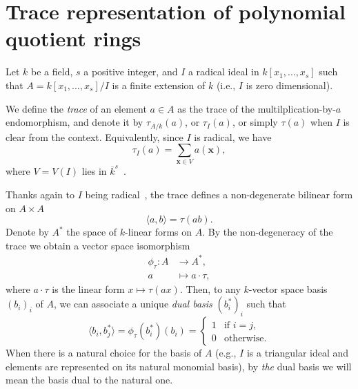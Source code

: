 \documentclass[12pt]{article}
\def\x {\ensuremath{\mathbf{x}}}
\newcommand{\ang}[1]{\langle#1\rangle}
\begin{document}

\section{Trace representation of polynomial quotient rings}

Let $k$ be a field, $s$ a positive integer, and $I$ a radical ideal in
$k[x_1,\dots,x_s]$ such that $A=k[x_1,\dots,x_s]/I$ is a finite
extension of $k$ (i.e., $I$ is zero dimensional).

We define the \emph{trace} of an element $a\in A$ as the trace of the
multilplication-by-$a$ endomorphism, and denote it by $\tau_{A/k}(a)$,
or $\tau_I(a)$, or simply $\tau(a)$ when $I$ is clear from the
context.  Equivalently, since $I$ is radical, we have
\begin{equation}\label{eq:tr}
\tau_{I}(a)=\sum_{\x \in V} a(\x),
\end{equation}
where $V=V(I)$ lies in $\overline{k}^s$~\cite{todo}.

Thanks again to $I$ being radical~\cite{todo}, the trace defines a
non-degenerate bilinear form on $A\times A$
\begin{equation}
  \label{eq:trace-def}
  \ang{a,b} = \tau(ab).
\end{equation}
Denote by $A^\ast$ the space of $k$-linear forms on $A$. By the
non-degeneracy of the trace we obtain a vector space isomorphism
\begin{equation}
  \label{eq:trace-isom}
  \begin{aligned}
  \phi_\tau : A &\to A^\ast,\\
            a &\mapsto a\cdot\tau,
  \end{aligned}
\end{equation}
where $a\cdot\tau$ is the linear form $x\mapsto\tau(ax)$. Then, to any
$k$-vector space basis $(b_i)_i$ of $A$, we can associate a unique
\emph{dual basis} $(b_i^\ast)_i$ such that
\begin{equation}
  \label{eq:dual-basis}
  \ang{b_i,b_j^\ast} = \phi_\tau(b_i^\ast)(b_i) = \begin{cases}
    1 &\text{if $i=j$,}\\
    0 &\text{otherwise}.
  \end{cases}
\end{equation}
When there is a natural choice for the basis of $A$ (e.g., $I$ is a
triangular ideal and elements are represented on its natural monomial
basis), by \emph{the} dual basis we will mean the basis dual to the
natural one.
\end{document}

